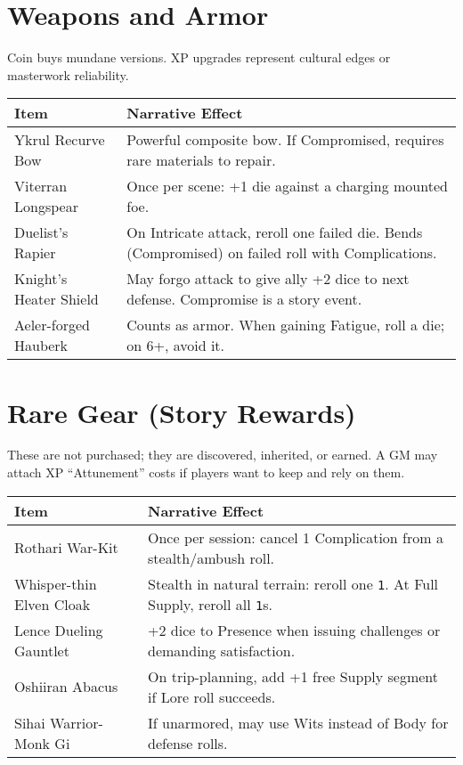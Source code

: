 \documentclass[12pt]{article}
\begin{document}
\section{Weapons and Armor}
Coin buys mundane versions. XP upgrades represent cultural edges or masterwork reliability.

\begin{tabularx}{\textwidth}{lX}
\textbf{Item} & \textbf{Narrative Effect} \\
\hline
Ykrul Recurve Bow & Powerful composite bow. If Compromised, requires rare materials to repair. \\
Viterran Longspear & Once per scene: +1 die against a charging mounted foe. \\
Duelist’s Rapier & On Intricate attack, reroll one failed die. Bends (Compromised) on failed roll with Complications. \\
Knight’s Heater Shield & May forgo attack to give ally +2 dice to next defense. Compromise is a story event. \\
Aeler-forged Hauberk & Counts as armor. When gaining Fatigue, roll a die; on 6+, avoid it. \\
\end{tabularx}

\section{Rare Gear (Story Rewards)}
These are not purchased; they are discovered, inherited, or earned.  
A GM may attach XP “Attunement” costs if players want to keep and rely on them.

\begin{tabularx}{\textwidth}{lX}
\textbf{Item} & \textbf{Narrative Effect} \\
\hline
Rothari War-Kit & Once per session: cancel 1 Complication from a stealth/ambush roll. \\
Whisper-thin Elven Cloak & Stealth in natural terrain: reroll one \texttt{1}. At Full Supply, reroll all \texttt{1}s. \\
Lence Dueling Gauntlet & +2 dice to Presence when issuing challenges or demanding satisfaction. \\
Oshiiran Abacus & On trip-planning, add +1 free Supply segment if Lore roll succeeds. \\
Sihai Warrior-Monk Gi & If unarmored, may use Wits instead of Body for defense rolls. \\
\end{tabularx}
\end{document}
